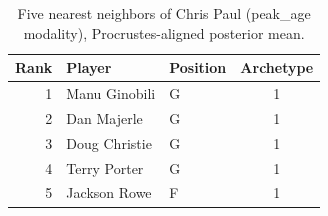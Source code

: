 \begin{table}[htbp]
  \centering\small
  \begin{tabular}{rllc}
    \toprule
    Rank & Player & Position & Archetype \\
    \midrule
    1 & Manu Ginobili & G & 1 \\
    2 & Dan Majerle & G & 1 \\
    3 & Doug Christie & G & 1 \\
    4 & Terry Porter & G & 1 \\
    5 & Jackson Rowe & F & 1 \\
    \bottomrule
  \end{tabular}
  \caption{Five nearest neighbors of Chris Paul (peak_age modality), Procrustes-aligned posterior mean.}
  \label{tab:Chris_Paul_neighbors_peak_age}
\end{table}

